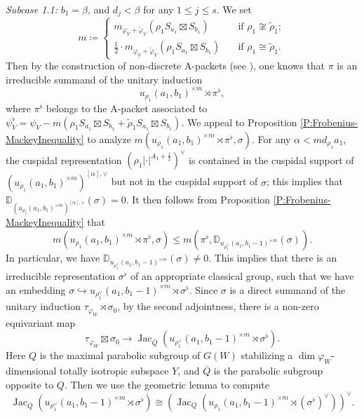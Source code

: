 \documentclass[11pt,letterpaper]{amsart}
\theoremstyle{plain}
\numberwithin{theorem}{section}
\numberwithin{equation}{subsection}
\theoremstyle{remark}
\newcommand{\Jac}{\operatorname{Jac}}
\newcommand{\D}{\mathbb{D}}
\begin{document}
\emph{Subcase 1.1:} $b_1=\beta$, and $d_j<\beta$ for any $1\leq j\leq s$. We set
\begin{equation}\label{E:DefIndMultiInA-parameter}
    m\coloneqq \begin{cases}
        m_{\varphi_V+\widetilde{\varphi}_V}\left(\rho_1 S_{a_1}\boxtimes S_{b_1}\right) \quad &\text{if }\rho_1\not\cong\widetilde{\rho}_1;\\
        \frac{1}{2}\cdot m_{\varphi_V+\widetilde{\varphi}_V}\left(\rho_1 S_{a_1}\boxtimes S_{b_1}\right) \quad &\text{if }\rho_1\cong\widetilde{\rho}_1.
    \end{cases}
\end{equation}
Then by the construction of non-discrete A-packets (see \cite[Prop. 2.4.3]{MR3135650}), one knows that $\pi$ is an irreducible summand of the unitary induction
\[
    u_{\rho_1}\left(a_1,b_1\right)^{\times m}\rtimes \pi^\flat,
\]
where $\pi^\flat$ belongs to the A-packet associated to $\psi_V^\flat = \psi_V - m\left(\rho_1 S_{a_1}\boxtimes S_{b_1} + \widetilde{\rho}_1 S_{a_1}\boxtimes S_{b_1}\right)$. We appeal to Proposition \ref{P:Frobenius-MackeyInequality} to analyze $m\left(u_{\rho_1}\left(a_1,b_1\right)^{\times m}\rtimes \pi^\flat,\sigma\right)$. For any $\alpha<md_{\rho_1}a_1$, the cuspidal representation $\left(\rho_1|\cdot|^{A_1+\frac{1}{2}}\right)^\vee$ is contained in the cuspidal support of $\left(u_{\rho_1}\left(a_1,b_1\right)^{\times m}\right)^{[\alpha],\vee}$ but not in the cuspidal support of $\sigma$; this implies that $\D_{\left(u_{\rho_1}\left(a_1,b_1\right)^{\times m}\right)^{[\alpha],\vee}}\left(\sigma\right)=0$. It then follows from Proposition \ref{P:Frobenius-MackeyInequality} that
\[
    m\left(u_{\rho_1}\left(a_1,b_1\right)^{\times m}\rtimes \pi^\flat,\sigma\right) \leq m\left(\pi^\flat, \D_{u_{\rho_1^\vee}\left(a_1,b_1-1\right)^{\times m}}\left(\sigma\right)\right).
\]
In particular, we have $\D_{u_{\rho_1^\vee}\left(a_1,b_1-1\right)^{\times m}}\left(\sigma\right)\neq0$. This implies that there is an irreducible representation $\sigma^\flat$ of an appropriate classical group, such that we have an embedding $\sigma \hookrightarrow u_{\rho_1^\vee}\left(a_1,b_1-1\right)^{\times m}\rtimes \sigma^\flat$.
Since $\sigma$ is a direct summand of the unitary induction $\tau_{\varphi_W}\rtimes\sigma_0$, by the second adjointness, there is a non-zero equivariant map
\[
    \tau_{\varphi_W}\boxtimes\sigma_0 \longrightarrow \Jac_{\overline{Q}}\left(u_{\rho_1^\vee}\left(a_1,b_1-1\right)^{\times m}\rtimes \sigma^\flat\right).
\]
Here $Q$ is the maximal parabolic subgroup of $G\left(W\right)$ stabilizing a $\dim\varphi_W$-dimensional totally isotropic subspace $Y$, and $\overline{Q}$ is the parabolic subgroup opposite to $Q$. Then we use the geometric lemma to compute
\[
    \Jac_{\overline{Q}}\left(u_{\rho_1^\vee}\left(a_1,b_1-1\right)^{\times m}\rtimes \sigma^\flat\right)\cong \left(\Jac_Q\left(u_{\rho_1}\left(a_1,b_1-1\right)^{\times m}\rtimes \left(\sigma^\flat\right)^\vee\right)\right)^\vee.
\]
\end{document}
